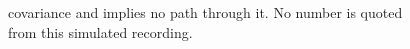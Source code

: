 \begin{figure}[htbp]
{covariance and implies no path through it. No number is quoted from
this simulated recording.} %

\end{figure}
